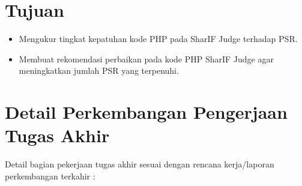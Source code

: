 \documentclass[a4paper,twoside]{article}
\begin{document}
	\section{Tujuan}
	\begin{itemize}
		\item Mengukur tingkat kepatuhan kode PHP pada SharIF Judge terhadap PSR.
		\item Membuat rekomendasi perbaikan pada kode PHP SharIF Judge agar meningkatkan jumlah PSR yang terpenuhi.
	\end{itemize}
	
	
	\section{Detail Perkembangan Pengerjaan Tugas Akhir}
	Detail bagian pekerjaan tugas akhir sesuai dengan rencana kerja/laporan perkembangan terkahir :
\end{document}
